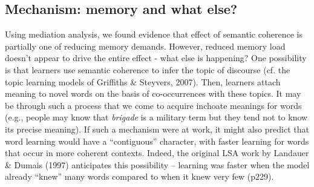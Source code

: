 \documentclass[man,floatsintext]{apa6}
\begin{document}
\subsection{Mechanism: memory and what else?}

Using mediation analysis, we found evidence that effect of semantic coherence is partially one of reducing memory demands. However, reduced memory load doesn't appear to drive the entire effect - what else is happening? One possibility is that learners use semantic coherence to infer the topic of discourse (cf. the topic learning models of Griffiths \& Steyvers, 2007). Then, learners attach meaning to novel words on the basis of co-occurrences with these topics. It may be through such a process that we come to acquire inchoate meanings for words (e.g., people may know that \emph{brigade} is a military term but they tend not to know its precise meaning). If such a mechanism were at work, it might also predict that word learning would have a ``contiguous'' character, with faster learning for words that occur in more coherent contexts. Indeed, the original LSA work by Landauer \& Dumais (1997) anticipates this possibility -- learning was faster when the model already ``knew'' many words compared to when it knew very few (p229).


\nocite{*}
\newpage


\end{document}
